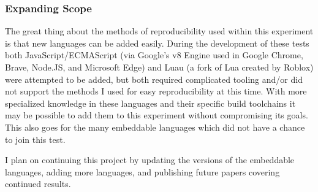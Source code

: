 \subsubsection{Expanding Scope}
The great thing about the methods of reproducibility used within this experiment is that new languages can be added easily. During the development of these tests both JavaScript/ECMAScript (via Google's v8 Engine\cite{v8} used in Google Chrome, Brave, Node.JS, and Microsoft Edge) and Luau (a fork of Lua created by Roblox\cite{luau}) were attempted to be added, but both required complicated tooling and/or did not support the methods I used for easy reproducibility at this time. With more specialized knowledge in these languages and their specific build toolchains it may be possible to add them to this experiment without compromising its goals. This also goes for the many embeddable languages which did not have a chance to join this test.

I plan on continuing this project by updating the versions of the embeddable languages, adding more languages, and publishing future papers covering continued results.
